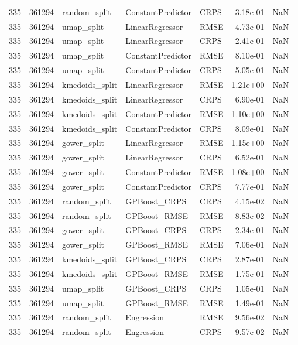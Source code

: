 \begin{tabular}{rrlllrr}
335 & 361294 & random\_split & ConstantPredictor & CRPS & 3.18e-01 & NaN \\
335 & 361294 & umap\_split & LinearRegressor & RMSE & 4.73e-01 & NaN \\
335 & 361294 & umap\_split & LinearRegressor & CRPS & 2.41e-01 & NaN \\
335 & 361294 & umap\_split & ConstantPredictor & RMSE & 8.10e-01 & NaN \\
335 & 361294 & umap\_split & ConstantPredictor & CRPS & 5.05e-01 & NaN \\
335 & 361294 & kmedoids\_split & LinearRegressor & RMSE & 1.21e+00 & NaN \\
335 & 361294 & kmedoids\_split & LinearRegressor & CRPS & 6.90e-01 & NaN \\
335 & 361294 & kmedoids\_split & ConstantPredictor & RMSE & 1.10e+00 & NaN \\
335 & 361294 & kmedoids\_split & ConstantPredictor & CRPS & 8.09e-01 & NaN \\
335 & 361294 & gower\_split & LinearRegressor & RMSE & 1.15e+00 & NaN \\
335 & 361294 & gower\_split & LinearRegressor & CRPS & 6.52e-01 & NaN \\
335 & 361294 & gower\_split & ConstantPredictor & RMSE & 1.08e+00 & NaN \\
335 & 361294 & gower\_split & ConstantPredictor & CRPS & 7.77e-01 & NaN \\
335 & 361294 & random\_split & GPBoost\_CRPS & CRPS & 4.15e-02 & NaN \\
335 & 361294 & random\_split & GPBoost\_RMSE & RMSE & 8.83e-02 & NaN \\
335 & 361294 & gower\_split & GPBoost\_CRPS & CRPS & 2.34e-01 & NaN \\
335 & 361294 & gower\_split & GPBoost\_RMSE & RMSE & 7.06e-01 & NaN \\
335 & 361294 & kmedoids\_split & GPBoost\_CRPS & CRPS & 2.87e-01 & NaN \\
335 & 361294 & kmedoids\_split & GPBoost\_RMSE & RMSE & 1.75e-01 & NaN \\
335 & 361294 & umap\_split & GPBoost\_CRPS & CRPS & 1.05e-01 & NaN \\
335 & 361294 & umap\_split & GPBoost\_RMSE & RMSE & 1.49e-01 & NaN \\
335 & 361294 & random\_split & Engression & RMSE & 9.56e-02 & NaN \\
335 & 361294 & random\_split & Engression & CRPS & 9.57e-02 & NaN \\

\end{tabular}
